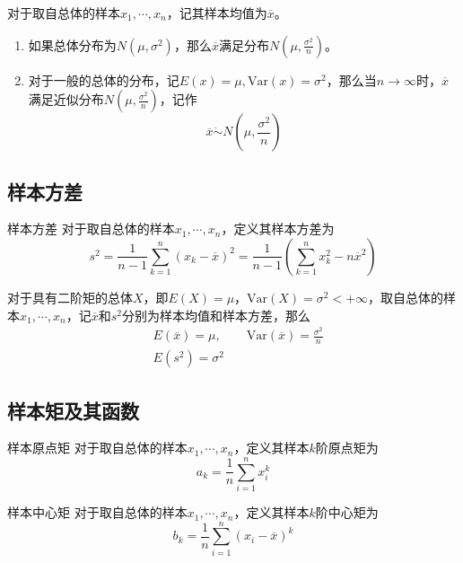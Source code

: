 \documentclass[lang = cn, scheme = chinese, thmcnt = section]{elegantbook}
\begin{document}
\begin{theorem}
	对于取自总体的样本$x_1,\cdots,x_n$，记其样本均值为$\overline{x}$。
	\begin{enumerate}
		\item 如果总体分布为$N(\mu,\sigma^2)$，那么$\overline{x}$满足分布$N(\mu,\frac{\sigma^2}{n})$。
		\item 对于一般的总体的分布，记$E(x)=\mu,\mathrm{Var}(x)=\sigma^2$，那么当$n\to\infty$时，$\overline{x}$满足近似分布$N(\mu,\frac{\sigma^2}{n})$，记作
		$$
		\overline{x}\dot{\sim}N(\mu,\frac{\sigma^2}{n})
		$$
	\end{enumerate}
\end{theorem}

\subsection{样本方差}

\begin{definition}{样本方差}
	对于取自总体的样本$x_1,\cdots,x_n$，定义其样本方差为
	$$
	s^2=\frac{1}{n-1}\sum_{k=1}^{n}(x_k-\overline{x})^2=\frac{1}{n-1}\left( \sum_{k=1}^{n}{x_k^2}-n\overline{x}^2 \right)
	$$
\end{definition}

\begin{theorem}
	对于具有二阶矩的总体$X$，即$E(X)=\mu$，$\mathrm{Var}(X)=\sigma^2<+\infty$，取自总体的样本$x_1,\cdots,x_n$，记$\overline{x}$和$s^2$分别为样本均值和样本方差，那么
	\begin{align*}
		&E(\overline{x})=\mu,\qquad \mathrm{Var}(\overline{x})=\frac{\sigma^2}{n}\\
		&E(s^2)=\sigma^2
	\end{align*}
\end{theorem}

\subsection{样本矩及其函数}

\begin{definition}{样本原点矩}
	对于取自总体的样本$x_1,\cdots,x_n$，定义其样本$k$阶原点矩为
	$$
	a_k=\frac{1}{n}\sum_{i=1}^{n}{x_i^k}
	$$
\end{definition}

\begin{definition}{样本中心矩}
	对于取自总体的样本$x_1,\cdots,x_n$，定义其样本$k$阶中心矩为
	$$
	b_k=\frac{1}{n}\sum_{i=1}^{n}{(x_i-\overline{x})^k}
	$$
\end{definition}
\end{document}
